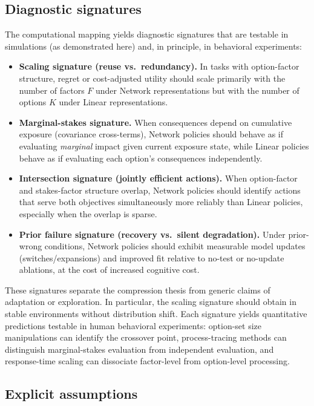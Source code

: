 \documentclass[11pt]{article}
\begin{document}
\subsection{Diagnostic signatures}

The computational mapping yields diagnostic signatures that are testable in simulations (as demonstrated here) and, in principle, in behavioral experiments:

\begin{itemize}[leftmargin=*]
\item \textbf{Scaling signature (reuse vs.\ redundancy).} In tasks with option-factor structure, regret or cost-adjusted utility should scale primarily with the number of factors $F$ under Network representations but with the number of options $K$ under Linear representations.
\item \textbf{Marginal-stakes signature.} When consequences depend on cumulative exposure (covariance cross-terms), Network policies should behave as if evaluating \emph{marginal} impact given current exposure state, while Linear policies behave as if evaluating each option's consequences independently.
\item \textbf{Intersection signature (jointly efficient actions).} When option-factor and stakes-factor structure overlap, Network policies should identify actions that serve both objectives simultaneously more reliably than Linear policies, especially when the overlap is sparse.
\item \textbf{Prior failure signature (recovery vs.\ silent degradation).} Under prior-wrong conditions, Network policies should exhibit measurable model updates (switches/expansions) and improved fit relative to no-test or no-update ablations, at the cost of increased cognitive cost.
\end{itemize}

These signatures separate the compression thesis from generic claims of adaptation or exploration. In particular, the scaling signature should obtain in stable environments without distribution shift.
Each signature yields quantitative predictions testable in human behavioral experiments: option-set size manipulations can identify the crossover point, process-tracing methods can distinguish marginal-stakes evaluation from independent evaluation, and response-time scaling can dissociate factor-level from option-level processing.


\subsection{Explicit assumptions}
\end{document}
